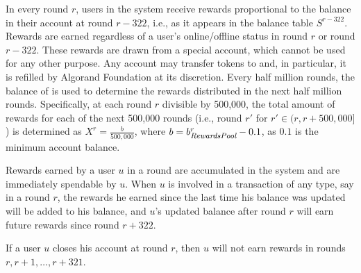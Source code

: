 \documentclass[../main.tex]{subfiles}
\begin{document}
In every round $r$, users in the system receive rewards proportional to the balance in their account at round $r-322$, i.e., as it appears in the balance table $S^{r-322}$. 
Rewards are earned regardless of a user's online/offline status in round $r$ or round $r-322$.
These rewards are drawn from a special \Rewards{} account, 
which cannot be used for any other purpose.
Any account may transfer tokens to \Rewards{} and, in particular, it is refilled by Algorand Foundation at its discretion.
Every half million rounds, 
the balance of \Rewards{} is used to determine the rewards distributed in the next half million rounds.
Specifically, at each round $r$ divisible by 500,000, the total amount of rewards for each of the next 500,000 rounds (i.e., round $r'$ for $r' \in (r,r+500,000]$) is determined as $X^r=\frac{b}{500,000}$, 
where $b = b^r_\textit{\footnotesize\textit{RewardsPool}{}}-0.1$, as $0.1$ is the minimum account balance. 

Rewards earned by a user $u$ in a round are accumulated in the system and are immediately spendable by $u$. 
When $u$ is involved in a transaction of any type, say in a round $r$, the rewards he earned since the last time his balance was updated will be added to his balance, and $u$'s updated balance after round $r$ will earn future rewards since round $r+322$.

If a user $u$ closes his account at round $r$, then $u$ will not earn rewards in rounds  $r,r+1,\ldots,r+321$.
\end{document}
